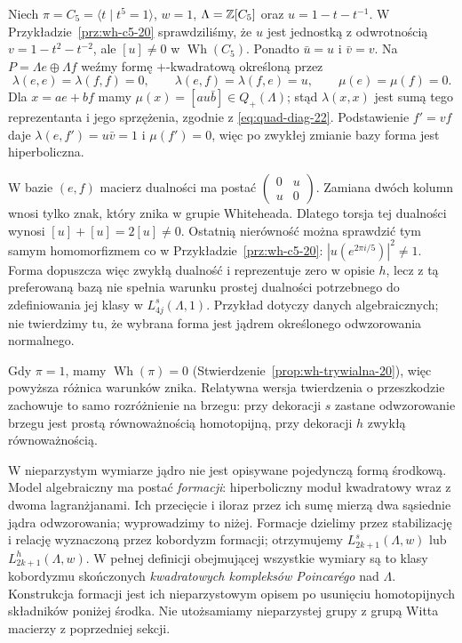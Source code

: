 \begin{przyklad}
\label{prz:dekoracje-C5-22}
Niech $\pi=C_5=\langle t\mid t^5=1\rangle$,
$w=1$, $\Lambda=\mathbb{Z}[C_5]$ oraz
$u=1-t-t^{-1}$. W
Przykładzie~\ref{prz:wh-c5-20} sprawdziliśmy,
że $u$ jest jednostką z odwrotnością
$v=1-t^2-t^{-2}$, ale $[u]\ne0$ w
$\operatorname{Wh}(C_5)$. Ponadto $\bar u=u$
i $\bar v=v$. Na $P=\Lambda e\oplus\Lambda f$
weźmy formę $+$-kwadratową określoną przez
\[
 \lambda(e,e)=\lambda(f,f)=0,\qquad
 \lambda(e,f)=\lambda(f,e)=u,\qquad
 \mu(e)=\mu(f)=0.
\]
Dla $x=ae+bf$ mamy
$\mu(x)=[a u\bar b]\in Q_+(\Lambda)$;
stąd $\lambda(x,x)$ jest sumą tego
reprezentanta i jego sprzężenia, zgodnie z
\eqref{eq:quad-diag-22}. Podstawienie
$f'=vf$ daje $\lambda(e,f')=u\bar v=1$
i $\mu(f')=0$, więc po zwykłej zmianie bazy
forma jest hiperboliczna.

W bazie $(e,f)$ macierz dualności ma postać
$\left(\begin{smallmatrix}0&u\\u&0\end{smallmatrix}\right)$.
Zamiana dwóch kolumn wnosi tylko znak,
który znika w grupie Whiteheada. Dlatego
torsja tej dualności wynosi
$[u]+[u]=2[u]\ne0$.
Ostatnią nierówność można sprawdzić tym
samym homomorfizmem co w
Przykładzie~\ref{prz:wh-c5-20}:
$|u(e^{2\pi i/5})|^2\ne1$.
Forma dopuszcza więc zwykłą dualność i
reprezentuje zero w opisie $h$, lecz z tą
preferowaną bazą nie spełnia warunku prostej
dualności potrzebnego do zdefiniowania jej
klasy w $L^s_{4j}(\Lambda,1)$.
Przykład dotyczy danych algebraicznych;
nie twierdzimy tu, że wybrana forma jest
jądrem określonego odwzorowania normalnego.
\end{przyklad}

Gdy $\pi=1$, mamy
$\operatorname{Wh}(\pi)=0$
(Stwierdzenie~\ref{prop:wh-trywialna-20}),
więc powyższa różnica warunków znika.
Relatywna wersja twierdzenia o przeszkodzie
zachowuje to samo rozróżnienie na brzegu:
przy dekoracji $s$ zastane odwzorowanie brzegu jest
prostą równoważnością homotopijną, przy
dekoracji $h$ zwykłą równoważnością.

W nieparzystym wymiarze jądro nie jest opisywane
pojedynczą formą środkową. Model algebraiczny ma
postać \emph{formacji}: hiperboliczny moduł
kwadratowy wraz z dwoma lagranżjanami. Ich
przecięcie i iloraz przez ich sumę mierzą dwa
sąsiednie jądra odwzorowania; wyprowadzimy to niżej.
Formacje dzielimy przez stabilizację i relację
wyznaczoną przez kobordyzm formacji; otrzymujemy
$L^s_{2k+1}(\Lambda,w)$ lub $L^h_{2k+1}(\Lambda,w)$.
W pełnej definicji obejmującej wszystkie wymiary
są to klasy kobordyzmu skończonych
\emph{kwadratowych kompleksów Poincarégo}
nad $\Lambda$. Konstrukcja formacji jest ich
nieparzystowym opisem po usunięciu homotopijnych
składników poniżej środka. Nie utożsamiamy
nieparzystej grupy z grupą Witta macierzy z poprzedniej sekcji.

